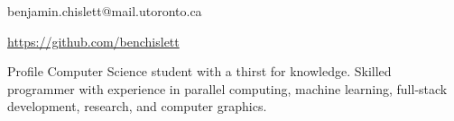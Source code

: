 \documentclass[11pt, letterpaper]{article}
\title{}
\author{Benjamin Chislett}
\date{}
\newcommand{\vbar}{\textbar\xspace}
\begin{document}
\begin{center}
  \Huge\theauthor
  \par
  \large{benjamin.chislett@mail.utoronto.ca}
  \par
  \large\url{https://github.com/benchislett}
\end{center}

\begin{section}{Profile}
Computer Science student with a thirst for knowledge.
Skilled programmer with experience in parallel computing, machine learning, full-stack development, research, and computer graphics.


\end{section}
\end{document}
